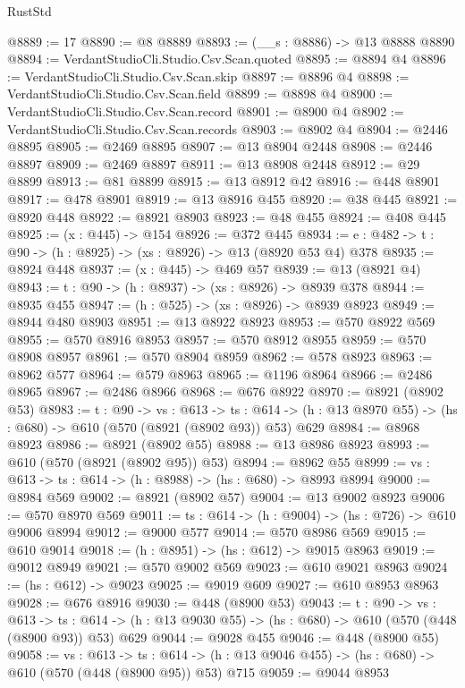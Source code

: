 \begin{lexlean}{RustStd}
\begin{coremodule}
@8889 := 17
@8890 := @8 @8889
@8893 := (__s : @8886) -> @13 @8888 @8890
@8894 := VerdantStudioCli.Studio.Csv.Scan.quoted
@8895 := @8894 @4
@8896 := VerdantStudioCli.Studio.Csv.Scan.skip
@8897 := @8896 @4
@8898 := VerdantStudioCli.Studio.Csv.Scan.field
@8899 := @8898 @4
@8900 := VerdantStudioCli.Studio.Csv.Scan.record
@8901 := @8900 @4
@8902 := VerdantStudioCli.Studio.Csv.Scan.records
@8903 := @8902 @4
@8904 := @2446 @8895
@8905 := @2469 @8895
@8907 := @13 @8904 @2448
@8908 := @2446 @8897
@8909 := @2469 @8897
@8911 := @13 @8908 @2448
@8912 := @29 @8899
@8913 := @81 @8899
@8915 := @13 @8912 @42
@8916 := @448 @8901
@8917 := @478 @8901
@8919 := @13 @8916 @455
@8920 := @38 @445
@8921 := @8920 @448
@8922 := @8921 @8903
@8923 := @48 @455
@8924 := @408 @445
@8925 := (x : @445) -> @154
@8926 := @372 @445
@8934 := {e : @482} -> {t : @90} -> (h : @8925) -> (xs : @8926) -> @13 (@8920 @53 @4) @378
@8935 := @8924 @448
@8937 := (x : @445) -> @469 @57
@8939 := @13 (@8921 @4)
@8943 := {t : @90} -> (h : @8937) -> (xs : @8926) -> @8939 @378
@8944 := @8935 @455
@8947 := (h : @525) -> (xs : @8926) -> @8939 @8923
@8949 := @8944 @480 @8903
@8951 := @13 @8922 @8923
@8953 := @570 @8922 @569
@8955 := @570 @8916 @8953
@8957 := @570 @8912 @8955
@8959 := @570 @8908 @8957
@8961 := @570 @8904 @8959
@8962 := @578 @8923
@8963 := @8962 @577
@8964 := @579 @8963
@8965 := @1196 @8964
@8966 := @2486 @8965
@8967 := @2486 @8966
@8968 := @676 @8922
@8970 := @8921 (@8902 @53)
@8983 := {t : @90} ->
  {vs : @613} ->
  {ts : @614} -> (h : @13 @8970 @55) -> (hs : @680) -> @610 (@570 (@8921 (@8902 @93)) @53) @629
@8984 := @8968 @8923
@8986 := @8921 (@8902 @55)
@8988 := @13 @8986 @8923
@8993 := @610 (@570 (@8921 (@8902 @95)) @53)
@8994 := @8962 @55
@8999 := {vs : @613} -> {ts : @614} -> (h : @8988) -> (hs : @680) -> @8993 @8994
@9000 := @8984 @569
@9002 := @8921 (@8902 @57)
@9004 := @13 @9002 @8923
@9006 := @570 @8970 @569
@9011 := {ts : @614} -> (h : @9004) -> (hs : @726) -> @610 @9006 @8994
@9012 := @9000 @577
@9014 := @570 @8986 @569
@9015 := @610 @9014
@9018 := (h : @8951) -> (hs : @612) -> @9015 @8963
@9019 := @9012 @8949
@9021 := @570 @9002 @569
@9023 := @610 @9021 @8963
@9024 := (hs : @612) -> @9023
@9025 := @9019 @609
@9027 := @610 @8953 @8963
@9028 := @676 @8916
@9030 := @448 (@8900 @53)
@9043 := {t : @90} ->
  {vs : @613} ->
  {ts : @614} -> (h : @13 @9030 @55) -> (hs : @680) -> @610 (@570 (@448 (@8900 @93)) @53) @629
@9044 := @9028 @455
@9046 := @448 (@8900 @55)
@9058 := {vs : @613} ->
  {ts : @614} -> (h : @13 @9046 @455) -> (hs : @680) -> @610 (@570 (@448 (@8900 @95)) @53) @715
@9059 := @9044 @8953

\end{coremodule}
\end{lexlean}
